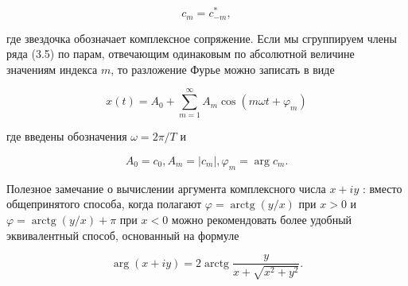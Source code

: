 \documentclass[10pt]{article}
\begin{document}
\begin{equation*}
c_{m}=c_{-m}^{*}, \tag{3.7}
\end{equation*}


где звездочка обозначает комплексное сопряжение. Если мы сгруппируем члены ряда (3.5) по парам, отвечающим одинаковым по абсолютной величине значениям индекса $m$, то разложение Фурье можно записать в виде


\begin{equation*}
x(t)=A_{0}+\sum_{m=1}^{\infty} A_{m} \cos \left(m \omega t+\varphi_{m}\right) \tag{3.8}
\end{equation*}


где введены обозначения $\omega=2 \pi / T$ и


\begin{equation*}
A_{0}=c_{0}, A_{m}=\left|c_{m}\right|, \varphi_{m}=\arg c_{m} . \tag{3.9}
\end{equation*}


Полезное замечание о вычислении аргумента комплексного числа $x+i y$ : вместо общепринятого способа, когда полагают $\varphi=\operatorname{arctg}(y / x)$ при $x>0$ и $\varphi=\operatorname{arctg}(y / x)+\pi$ при $x<0$ можно рекомендовать более удобный эквивалентный способ, основанный на формуле


\begin{equation*}
\arg (x+i y)=2 \operatorname{arctg} \frac{y}{x+\sqrt{x^{2}+y^{2}}} . \tag{3.10}
\end{equation*}
\end{document}
